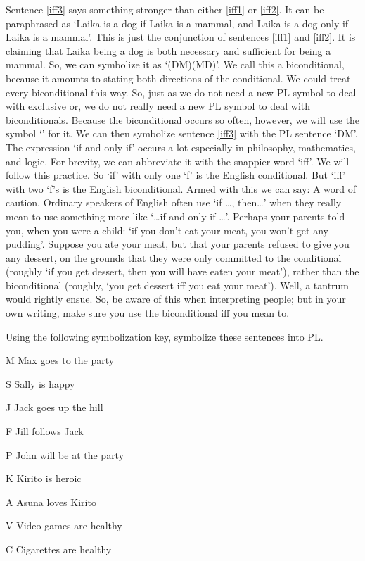 Sentence \ref{iff3} says something stronger than either \ref{iff1} or \ref{iff2}. It can be paraphrased as ‘Laika is a dog if Laika is a mammal, and Laika is a dog only if Laika is a mammal’. This is just the conjunction of sentences \ref{iff1} and \ref{iff2}. It is claiming that Laika being a dog is both necessary and sufficient for being a mammal. So, we can symbolize it as ‘(D\eif M)\eand (M\eif D)’. We call this a \gls{biconditional}, because it amounts to stating both directions of the conditional.
We could treat every biconditional this way. So, just as we do not need a new PL symbol to deal with exclusive or, we do not really need a new PL symbol to deal with biconditionals. Because the biconditional occurs so often, however, we will use the symbol ‘\eiff’ for it. We can then symbolize sentence \ref{iff3} with the PL sentence ‘D\eiff M’.
The expression ‘if and only if’ occurs a lot especially in philosophy, mathematics, and logic. For brevity, we can abbreviate it with the snappier word ‘iff’. We will follow this practice. So ‘if’ with only one ‘f’ is the English conditional. But ‘iff’ with two ‘f’s is the English biconditional. Armed with this we can say:
A word of caution. Ordinary speakers of English often use ‘if \ldots , then\ldots ’ when they really mean to use something more like ‘\ldots if and only if \ldots ’. Perhaps your parents told you, when you were a child: ‘if you don’t eat your meat, you won’t get any pudding’. Suppose you ate your meat, but that your parents refused to give you any dessert, on the grounds that they were only committed to the conditional (roughly ‘if you get dessert, then you will have eaten your meat’), rather than the biconditional (roughly, ‘you get dessert iff you eat your meat’). Well, a tantrum would rightly ensue. So, be aware of this when interpreting people; but in your own writing, make sure you use the biconditional iff you mean to.

\russell

\practiceproblems
\problempart
\label{pr.basicsymbol}
Using the following symbolization key, symbolize these sentences into PL.
	\begin{ekey}
		\item[M] Max goes to the party
		\item[S] Sally is happy
		\item[J] Jack goes up the hill
		\item[F] Jill follows Jack
		\item[P] John will be at the party
		\item[K] Kirito is heroic
		\item[A] Asuna loves Kirito
		\item[V] Video games are healthy
		\item[C] Cigarettes are healthy
	\end{ekey}

